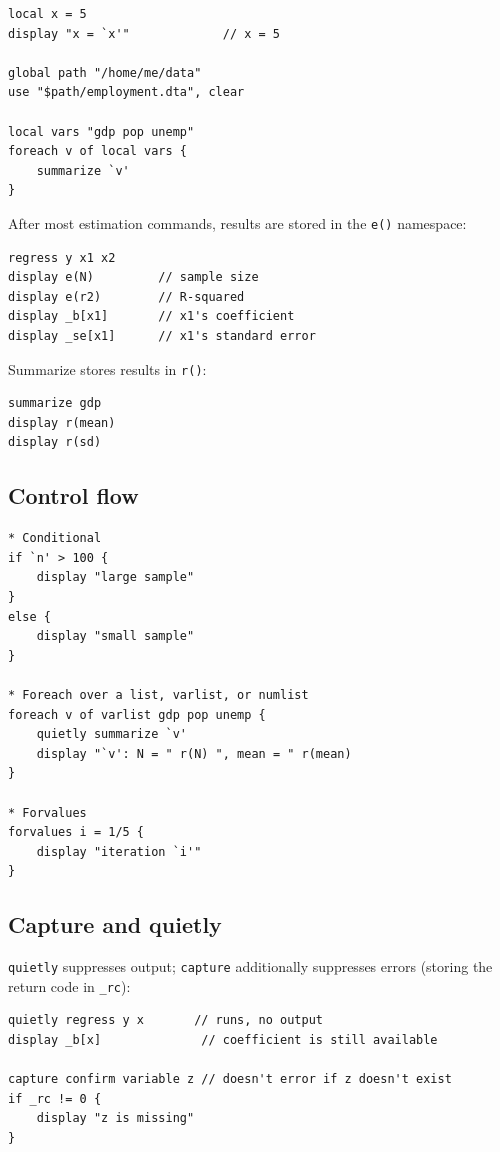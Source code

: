 \documentclass[11pt,letterpaper]{article}
\begin{document}
\begin{lstlisting}
local x = 5
display "x = `x'"             // x = 5

global path "/home/me/data"
use "$path/employment.dta", clear

local vars "gdp pop unemp"
foreach v of local vars {
    summarize `v'
}
\end{lstlisting}

After most estimation commands, results are stored in the \texttt{e()}
namespace:

\begin{lstlisting}
regress y x1 x2
display e(N)         // sample size
display e(r2)        // R-squared
display _b[x1]       // x1's coefficient
display _se[x1]      // x1's standard error
\end{lstlisting}

Summarize stores results in \texttt{r()}:

\begin{lstlisting}
summarize gdp
display r(mean)
display r(sd)
\end{lstlisting}

\subsection{Control flow}

\begin{lstlisting}
* Conditional
if `n' > 100 {
    display "large sample"
}
else {
    display "small sample"
}

* Foreach over a list, varlist, or numlist
foreach v of varlist gdp pop unemp {
    quietly summarize `v'
    display "`v': N = " r(N) ", mean = " r(mean)
}

* Forvalues
forvalues i = 1/5 {
    display "iteration `i'"
}
\end{lstlisting}

\subsection{Capture and quietly}

\texttt{quietly} suppresses output; \texttt{capture} additionally
suppresses errors (storing the return code in \texttt{\_rc}):

\begin{lstlisting}
quietly regress y x       // runs, no output
display _b[x]              // coefficient is still available

capture confirm variable z // doesn't error if z doesn't exist
if _rc != 0 {
    display "z is missing"
}
\end{lstlisting}
\end{document}
